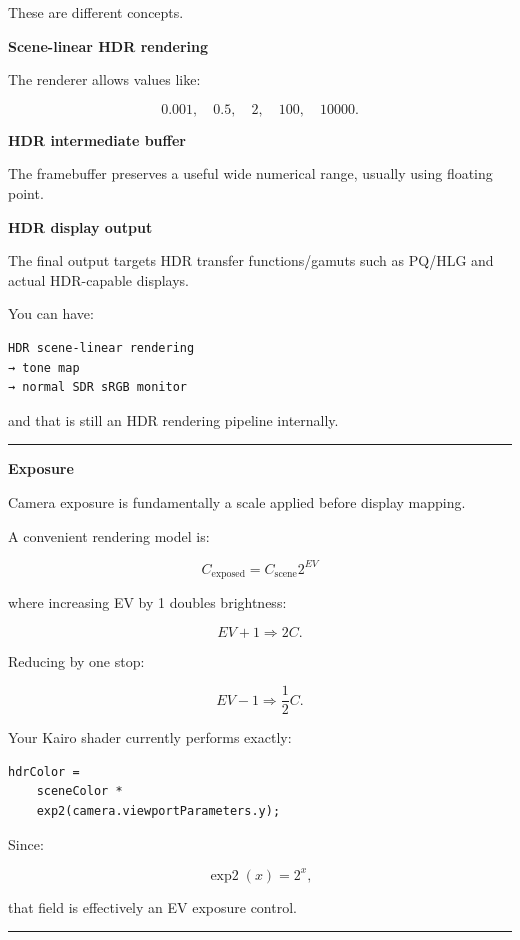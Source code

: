 These are different concepts.

\textbf{Scene-linear HDR rendering}

The renderer allows values like:

\[
0.001,\quad0.5,\quad2,\quad100,\quad10000.
\]

\textbf{HDR intermediate buffer}

The framebuffer preserves a useful wide numerical range, usually using floating point.

\textbf{HDR display output}

The final output targets HDR transfer functions/gamuts such as PQ/HLG and actual HDR-capable displays.

You can have:

\begin{verbatim}
HDR scene-linear rendering
→ tone map
→ normal SDR sRGB monitor
\end{verbatim}

and that is still an HDR rendering pipeline internally.

\begin{center}\rule{0.5\linewidth}{0.5pt}\end{center}

\textbf{Exposure}

Camera exposure is fundamentally a scale applied before display mapping.

A convenient rendering model is:

\[
\boxed{
C_{\text{exposed}}
=
C_{\text{scene}}2^{EV}
}
\]

where increasing EV by 1 doubles brightness:

\[
EV+1
\Rightarrow
2C.
\]

Reducing by one stop:

\[
EV-1
\Rightarrow
\frac12C.
\]

Your Kairo shader currently performs exactly:

\begin{verbatim}
hdrColor =
    sceneColor *
    exp2(camera.viewportParameters.y);
\end{verbatim}

Since:

\[
\operatorname{exp2}(x)=2^x,
\]

that field is effectively an EV exposure control.

\begin{center}\rule{0.5\linewidth}{0.5pt}\end{center}

